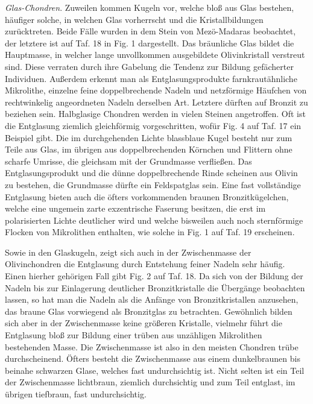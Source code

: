 \documentclass[a4paper, 11pt, oneside, polutonikogreek, german]{article}
\begin{document}
\emph{Glas-Chondren}. Zuweilen kommen Kugeln vor, welche bloß aus Glas bestehen, häufiger solche, in welchen Glas vorherrscht und die Kristallbildungen zurücktreten. Beide Fälle wurden in dem Stein von Mezö-Madaras beobachtet, der letztere ist auf Taf. 18 in Fig. 1 dargestellt. Das bräunliche Glas bildet die Hauptmasse, in welcher lange unvollkommen ausgebildete Olivinkristall verstreut sind. Diese verraten durch ihre Gabelung die Tendenz zur Bildung gefächerter Individuen. Außerdem erkennt man als Entglasungsprodukte farnkrautähnliche Mikrolithe, einzelne feine doppelbrechende Nadeln und netzförmige Häufchen von rechtwinkelig angeordneten Nadeln derselben Art. Letztere dürften auf Bronzit zu beziehen sein. Halbglasige Chondren werden in vielen Steinen angetroffen. Oft ist die Entglasung ziemlich gleichförmig vorgeschritten, wofür Fig. 4 auf Taf. 17 ein Beispiel gibt. Die im durchgehenden Lichte blassblaue Kugel besteht nur zum Teile aus Glas, im übrigen aus doppelbrechenden Körnchen und Flittern ohne scharfe Umrisse, die gleichsam mit der Grundmasse verfließen. Das Entglasungsprodukt und die dünne doppelbrechende Rinde scheinen aus Olivin zu bestehen, die Grundmasse dürfte ein Feldspatglas sein. Eine fast vollständige Entglasung bieten auch die öfters vorkommenden braunen Bronzitkügelchen, welche eine ungemein zarte exzentrische Faserung besitzen, die erst im polarisierten Lichte deutlicher wird und welche bisweilen auch noch sternförmige Flocken von Mikrolithen enthalten, wie solche in Fig. 1 auf Taf. 19 erscheinen.

Sowie in den Glaskugeln, zeigt sich auch in der Zwischenmasse der Olivinchondren die Entglasung durch Entstehung feiner Nadeln sehr häufig. Einen hierher gehörigen Fall gibt Fig. 2 auf Taf. 18. Da sich von der Bildung der Nadeln bis zur Einlagerung deutlicher Bronzitkristalle die Übergänge beobachten lassen, so hat man die Nadeln als die Anfänge von Bronzitkristallen anzusehen, das braune Glas vorwiegend als Bronzitglas zu betrachten. Gewöhnlich bilden sich aber in der Zwischenmasse keine größeren Kristalle, vielmehr führt die Entglasung bloß zur Bildung einer trüben aus unzähligen Mikrolithen bestehenden Masse. Die Zwischenmasse ist also in den meisten Chondren trübe durchscheinend. Öfters besteht die Zwischenmasse aus einem dunkelbraunen bis beinahe schwarzen Glase, welches fast undurchsichtig ist. Nicht selten ist ein Teil der Zwischenmasse lichtbraun, ziemlich durchsichtig und zum Teil entglast, im übrigen tiefbraun, fast undurchsichtig.
\end{document}
